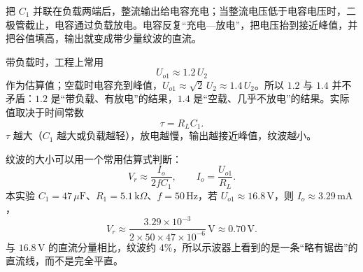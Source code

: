 \documentclass[11pt]{ctexart}
\let\origsubhdr\subhdr
\renewcommand{\subhdr}[1]{\needspace{3\baselineskip}\origsubhdr{#1}}
\begin{document}

把 $C_1$ 并联在负载两端后，整流输出给电容充电；当整流电压低于电容电压时，二极管截止，电容通过负载放电。电容反复“充电—放电”，把电压抬到接近峰值，并把谷值填高，输出就变成带少量纹波的直流。

带负载时，工程上常用
\[
U_{o1}\approx1.2\,U_2
\]
作为估算值；空载时电容充到峰值，$U_{o1}\approx\sqrt2\,U_2\approx1.4\,U_2$。所以 $1.2$ 与 $1.4$ 并不矛盾：$1.2$ 是“带负载、有放电”的结果，$1.4$ 是“空载、几乎不放电”的结果。实际值取决于时间常数
\[
\tau=R_LC_1.
\]
$\tau$ 越大（$C_1$ 越大或负载越轻），放电越慢，输出越接近峰值，纹波越小。

纹波的大小可以用一个常用估算式判断：
\[
V_r\approx\frac{I_o}{2fC_1},\qquad I_o=\frac{U_{o1}}{R_L}.
\]
本实验 $C_1=47\,\mu\mathrm{F}$、$R_1=5.1\,\mathrm{k}\Omega$、$f=50\,\mathrm{Hz}$，若 $U_{o1}\approx16.8\,\mathrm{V}$，则 $I_o\approx3.29\,\mathrm{mA}$，
\[
V_r\approx\frac{3.29\times10^{-3}}{2\times50\times47\times10^{-6}}\,\mathrm{V}\approx0.70\,\mathrm{V}.
\]
与 $16.8\,\mathrm{V}$ 的直流分量相比，纹波约 $4\%$，所以示波器上看到的是一条“略有锯齿”的直流线，而不是完全平直。
\end{document}
